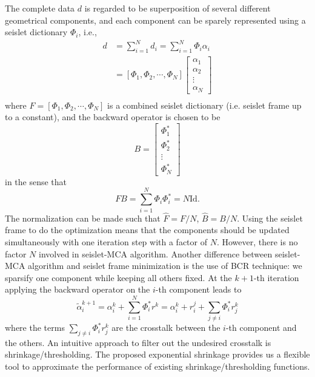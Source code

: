 \label{app:seisletframe}

The complete data $d$ is regarded to be superposition of several different geometrical components, and each component can be sparely represented using a seislet dictionary $\Phi_i$, i.e.,
\begin{equation}
\begin{array}{ll}
  d&=\sum_{i=1}^N d_i=\sum_{i=1}^N \Phi_i \alpha_i\\
  &=[\Phi_1,\Phi_2,\cdots,\Phi_N]\left[\begin{array}{l}
                                        \alpha_1\\
                                        \alpha_2\\
                                        \vdots\\
                                        \alpha_N
                                       \end{array}
\right]\\
\end{array}
\end{equation}
where $F=[\Phi_1,\Phi_2,\cdots,\Phi_N]$ is a combined seislet dictionary (i.e. seislet frame up to a constant), and the backward operator is chosen to be
\begin{equation}
 B=\left[\begin{array}{l}
                \Phi_1^{*}\\
		\Phi_2^{*}\\
                \vdots\\
                \Phi_N^{*}
   \end{array} \right]
\end{equation}
in the sense that
\begin{equation}
 FB=\sum_{i=1}^N\Phi_i\Phi_i^{*}=N \mathrm{Id}.
\end{equation}
The normalization can be made such that $\hat{F}=F/N$, $\hat{B}=B/N$. Using the seislet frame to do the optimization means that the components should be updated simultaneously with one iteration step with a factor of $N$. However, there is no factor $N$ involved in seislet-MCA algorithm. Another difference between seislet-MCA algorithm and seislet frame minimization is the use of BCR technique: we sparsify one component while keeping all others fixed.  At the $k+1$-th iteration applying the backward operator on the $i$-th component leads to
\begin{equation}
\tilde{\alpha}_i^{k+1}=\alpha_i^k+\sum_{i=1}^N\Phi_i^{*} r^k=\alpha_i^k+r_i^j+\sum_{j\neq i}\Phi_i^{*} r_j^k
\end{equation}
where the terms $\sum_{j\neq i}\Phi_i^{*}r_j^k$ are the crosstalk between the $i$-th component and the others. An intuitive approach to filter out the undesired crosstalk is shrinkage/thresholding. The proposed exponential shrinkage provides us a flexible tool to approximate the performance of existing shrinkage/thresholding functions.



